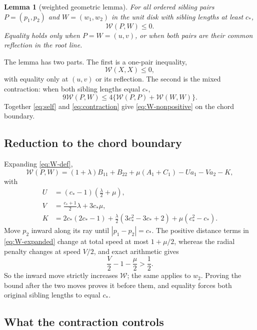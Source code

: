\documentclass[11pt]{article}
\theoremstyle{plain}
\newtheorem{lemma}[theorem]{Lemma}
\theoremstyle{definition}
\theoremstyle{remark}
\newcommand{\cstar}{c_{\!*}}
\newcommand{\W}{\mathcal W}
\begin{document}
\begin{lemma}[weighted geometric lemma]\label{lem:weighted}
For all ordered sibling pairs $P=(p_1,p_2)$ and $W=(w_1,w_2)$ in the unit
disk with sibling lengths at least $\cstar$,
\begin{equation}\label{eq:W-nonpositive}
 \W(P,W)\le0 .
\end{equation}
Equality holds only when $P=W=(u,v)$, or when both pairs are their common
reflection in the root line.
\end{lemma}

The lemma has two parts.  The first is a one-pair inequality,
\begin{equation}\label{eq:self}
 \W(X,X)\le0,
\end{equation}
with equality only at $(u,v)$ or its reflection.  The second is the mixed
contraction: when both sibling lengths equal $\cstar$,
\begin{equation}\label{eq:contraction}
 9\W(P,W)\le4\bigl\{\W(P,P)+\W(W,W)\bigr\}.
\end{equation}
Together \eqref{eq:self} and \eqref{eq:contraction} give
\eqref{eq:W-nonpositive} on the chord boundary.

\subsection{Reduction to the chord boundary}

Expanding \eqref{eq:W-def},
\begin{equation}\label{eq:W-expanded}
 \W(P,W)=(1+\lambda)B_{11}+B_{22}+\mu(A_1+C_1)-Ua_1-Va_2-K,
\end{equation}
with
\begin{align*}
 U&=(\cstar-1)\left(\frac\lambda2+\mu\right),\\
 V&=\frac{\cstar+1}{2}\lambda+3\cstar\mu,\\
 K&=2\cstar(2\cstar-1)+\frac\lambda2(3\cstar^2-3\cstar+2)+\mu(\cstar^2-\cstar).
\end{align*}
Move $p_2$ inward along its ray until $|p_1-p_2|=\cstar$.  The positive
distance terms in \eqref{eq:W-expanded} change at total speed at most
$1+\mu/2$, whereas the radial penalty changes at speed $V/2$, and exact
arithmetic gives
\[
 \frac V2-1-\frac\mu2>\frac12 .
\]
So the inward move strictly increases $\W$; the same applies to $w_2$.
Proving the bound after the two moves proves it before them, and equality
forces both original sibling lengths to equal $\cstar$.

\subsection{What the contraction controls}
\end{document}
